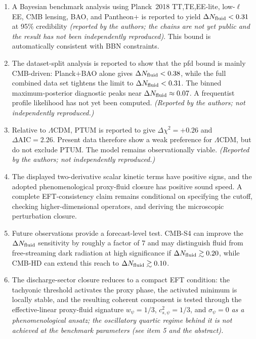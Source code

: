 \documentclass[epj]{svjour}
\begin{document}
\begin{enumerate}[label=(\arabic*)]
\item A Bayesian benchmark analysis using Planck~2018 TT,TE,EE-lite,
      low-$\ell$ EE, CMB lensing, BAO, and Pantheon$+$ is reported to
      yield $\Delta N_{\rm fluid}<0.31$ at 95\% credibility
      \emph{(reported by the authors; the chains are not yet public and
      the result has not been independently reproduced)}. This bound
      is automatically consistent with BBN constraints.

\item The dataset-split analysis is reported to show that the pfd
      bound is mainly CMB-driven: Planck$+$BAO alone gives
      $\Delta N_{\rm fluid}<0.38$, while the full combined data
      set tightens the limit to $\Delta N_{\rm fluid}<0.31$.
      The binned maximum-posterior diagnostic peaks near
      $\Delta N_{\rm fluid}\approx0.07$. A frequentist profile
      likelihood has not yet been computed. \emph{(Reported by the
      authors; not independently reproduced.)}

\item Relative to $\Lambda$CDM, PTUM is reported to give
      $\Delta\chi^2=+0.26$ and
      $\Delta\mathrm{AIC}=2.26$. Present data therefore show a
      weak preference for $\Lambda$CDM, but do not exclude PTUM.
      The model remains observationally viable.
      \emph{(Reported by the authors; not independently reproduced.)}

\item The displayed two-derivative scalar kinetic terms have
      positive signs, and the adopted phenomenological proxy-fluid
      closure has positive sound speed. A complete EFT-consistency
      claim remains conditional on specifying the cutoff, checking
      higher-dimensional operators, and deriving the microscopic
      perturbation closure.

\item Future observations provide a forecast-level test. CMB-S4 can
      improve the $\Delta N_{\rm fluid}$ sensitivity by roughly a
      factor of $7$ and may distinguish fluid from free-streaming dark
      radiation at high significance if
      $\Delta N_{\rm fluid}\gtrsim0.20$, while CMB-HD can extend
      this reach to $\Delta N_{\rm fluid}\gtrsim0.10$.
\item The discharge-sector closure reduces to a compact EFT condition:
      the tachyonic threshold activates the proxy phase, the activated minimum
      is locally stable, and the resulting coherent component is tested through
      the effective-linear proxy-fluid signature $w_\psi=1/3$,
      $c_{s,\psi}^2=1/3$, and $\sigma_\psi=0$ \emph{as a phenomenological
      ansatz; the oscillatory quartic regime behind it is not achieved at
      the benchmark parameters (see item 5 and the abstract).}
\end{enumerate}
\end{document}
